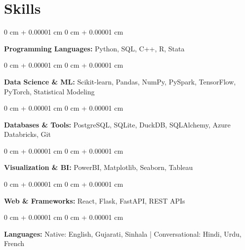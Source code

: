 \documentclass[10 pt,letterpaper]{article}
\newenvironment{onecolentry}{
    \begin{adjustwidth}{
        0 cm + 0.00001 cm
    }{
        0 cm + 0.00001 cm
    }
}{
    \end{adjustwidth}
} %
\begin{document}
    





    \section{Skills}
        
        \begin{onecolentry}
            \textbf{Programming Languages:} Python, SQL, C++, R, Stata
        \end{onecolentry}

        \begin{onecolentry}
            \textbf{Data Science \& ML:} Scikit-learn, Pandas, NumPy, PySpark, 
            TensorFlow, PyTorch, Statistical Modeling
        \end{onecolentry}

        \begin{onecolentry}
            \textbf{Databases \& Tools:} PostgreSQL, SQLite, DuckDB, SQLAlchemy, 
            Azure Databricks, Git
        \end{onecolentry}

        \begin{onecolentry}
            \textbf{Visualization \& BI:} PowerBI, Matplotlib, Seaborn, Tableau
        \end{onecolentry}

        \begin{onecolentry}
            \textbf{Web \& Frameworks:} React, Flask, FastAPI, REST APIs
        \end{onecolentry}

        \begin{onecolentry}
            \textbf{Languages:} Native: English, Gujarati, Sinhala | 
            Conversational: Hindi, Urdu, French
        \end{onecolentry}
        


    
\end{document}
